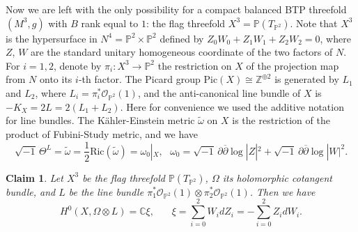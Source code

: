 \documentclass{amsart}
\numberwithin{equation}{section}
\newtheorem{claim}  [theorem]     {Claim}
\theoremstyle{definition}
\renewcommand{\1}{\mathds{1}}
\renewcommand{\>}{\rightarrow}
\begin{document}
Now we are left with the only possibility for a compact balanced BTP threefold $(M^3,g)$ with $B$ rank equal to $1$: the flag threefold $X^3 = {\mathbb P}(T_{{\mathbb P}^2} )$. Note that $X^3$ is the hypersurface in $N^4={\mathbb P}^2\times {\mathbb P}^2$ defined by $Z_0W_0+Z_1W_1+Z_2W_2=0$, where $Z$, $W$ are the standard unitary homogeneous coordinate of the two factors of $N$. For $i=1,2$, denote by $\pi_i: X^3 \rightarrow {\mathbb P}^2$ the restriction on $X$ of the projection map from $N$ onto its $i$-th factor. The Picard group $\mbox{Pic}(X)\cong {\mathbb Z}^{\oplus 2}$ is generated by $L_1$ and $L_2$, where $L_i=\pi_i^{\ast}{\mathcal O}_{{\mathbb P}^2}(1)$, and the anti-canonical line bundle of $X$ is $-K_{\!X} = 2L=2(L_1+L_2)$. Here for convenience we used the additive notation for line bundles. The K\"ahler-Einstein metric $\tilde{\omega}$ on $X$ is the restriction of the product of Fubini-Study metric, and we have
\begin{equation} \label{eq:7.13}
 \sqrt{-1}\, \Theta^L = \tilde{\omega} = \frac{1}{2}\mbox{Ric}(\tilde{\omega}) = \omega_0|_X, \ \ \ \omega_0 = \sqrt{-1} \, \partial \overline{\partial} \log |Z|^2 + \sqrt{-1} \, \partial \overline{\partial} \log |W|^2  .
 \end{equation}

\begin{claim} \label{eq:7.14}
Let $X^3$ be the flag threefold ${\mathbb P}(T_{{\mathbb P}^2} )$, $\Omega$ its holomorphic cotangent bundle, and $L$ be the line bundle  $\pi_1^{\ast}{\mathcal O}_{{\mathbb P}^2}(1) \otimes \pi_2^{\ast}{\mathcal O}_{{\mathbb P}^2}(1)$. Then we have
\[H^0(X, \Omega \otimes L) = {\mathbb C} \xi, \ \ \ \ \ \ \ \ \xi = \sum_{i=0}^2 W_idZ_i = - \sum_{i=0}^2 Z_idW_i.\]
\end{claim}
\end{document}
